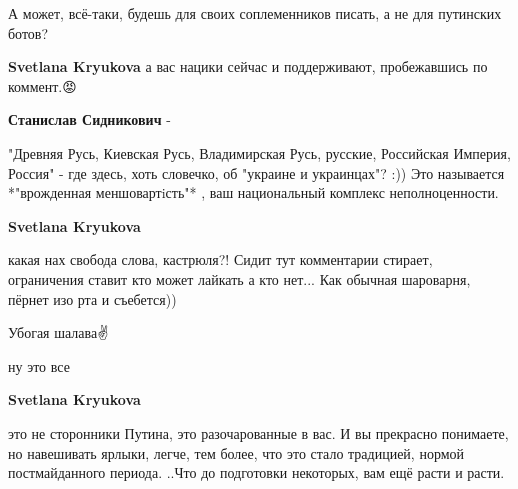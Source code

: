 \begin{itemize}
\begin{itemize}
А может, всё-таки, будешь для своих соплеменников писать, а не для путинских ботов?

 
\textbf{Svetlana Kryukova} а вас нацики сейчас и поддерживают, пробежавшись по коммент.😡

 
\textbf{Станислав Сидникович} -

"Древняя Русь, Киевская Русь, Владимирская Русь, русские, Российская Империя,
Россия" - где здесь, хоть словечко, об "украине и украинцах"? :)) Это
называется *"врожденная меншовартiсть"* , ваш национальный комплекс
неполноценности.


 
\textbf{Svetlana Kryukova} 

какая нах свобода слова, кастрюля?! Сидит тут комментарии стирает, ограничения
ставит кто может лайкать а кто нет... Как обычная шароварня, пёрнет изо рта и
съебется))

Убогая шалава✌️

 
ну это все

 
\textbf{Svetlana Kryukova} 

это не сторонники Путина, это разочарованные в вас. И вы прекрасно понимаете, но
навешивать ярлыки, легче, тем более, что это стало традицией, нормой
постмайданного периода. ..Что до подготовки некоторых, вам ещё расти и расти.



\end{itemize}
\end{itemize}
